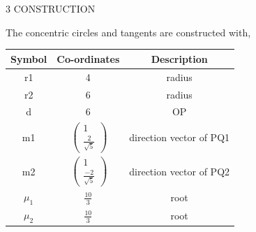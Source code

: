 \documentclass[a4paper,10pt]{report}
\begin{document}
\begin{multicols}{2}
\vspace{2mm}\\
\vspace{2mm}\\
\centering \large\textsc{3  C}\footnotesize\textsc{ONSTRUCTION}\vspace{5mm}\\
\raggedright\large{The concentric circles and tangents are constructed with,} 
\begin{center}
    \label{tab:truthtable}
    \setlength{\arrayrulewidth}{0.2mm}
\setlength{\tabcolsep}{5pt}
\renewcommand{\arraystretch}{1.25}
    \begin{tabular}{|c|c|c|}
    \hline %
      \large\textbf{Symbol} & \large\textbf{Co-ordinates} & \large\textbf{Description}\\
      \hline
       \large r1& 4& \large{radius}\\
       \large r2& 6& \large{radius}\\
       \large d & 6 & OP\\
	\large m1 & $\ \begin{pmatrix} 1\\\frac{2}{\sqrt{5}} \end{pmatrix}$ & \large direction vector of PQ1\\
	\large m2 & $\ \begin{pmatrix} 1\\\frac{-2}{\sqrt{5}} \end{pmatrix}$ & \large direction vector of PQ2\\
        \large$ \mu_1$ & $\frac{10}{3}$ & \large{root}\\
	\large $\mu_2$ & $\frac{10}{3}$ & \large{root}\\

\end{tabular}
\end{center}
\end{multicols}
\end{document}
